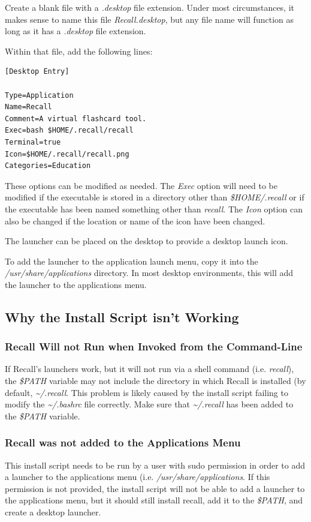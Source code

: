 \documentclass[letterpaper]{article}
\begin{document}
Create a blank file with a \textit{.desktop} file extension. Under most circumstances, it makes sense to name this file \textit{Recall.desktop}, but any file name will function as long as it has a \textit{.desktop} file extension.

Within that file, add the following lines:
\begin{verbatim}
[Desktop Entry]

Type=Application
Name=Recall
Comment=A virtual flashcard tool.
Exec=bash $HOME/.recall/recall
Terminal=true
Icon=$HOME/.recall/recall.png
Categories=Education
\end{verbatim}

These options can be modified as needed. The \textit{Exec} option will need to be modified if the executable is stored in a directory other than \textit{\$HOME/.recall} or if the executable has been named something other than \textit{recall}. The \textit{Icon} option can also be changed if the location or name of the icon have been changed.

The launcher can be placed on the desktop to provide a desktop launch icon.

To add the launcher to the application launch menu, copy it into the \textit{/usr/share/applications} directory. In most desktop environments, this will add the launcher to the applications menu.

\subsection{Why the Install Script isn't Working} \label{why the install script might not work}

\subsubsection{Recall Will not Run when Invoked from the Command-Line}
If Recall's launchers work, but it will not run via a shell command (i.e. \textit{recall}), the \textit{\$PATH} variable may not include the directory in which Recall is installed (by default, \textit{\~{}/.recall}. This problem is likely caused by the install script failing to modify the \textit{\~{}/.bashrc} file correctly. Make sure that \textit{\~{}/.recall} has been added to the \textit{\$PATH} variable.

\subsubsection{Recall was not added to the Applications Menu}
This install script needs to be run by a user with sudo permission in order to add a launcher to the applications menu (i.e. \textit{/usr/share/applications}. If this permission is not provided, the install script will not be able to add a launcher to the applications menu, but it should still install recall, add it to the \textit{\$PATH}, and create a desktop launcher.
\end{document}
